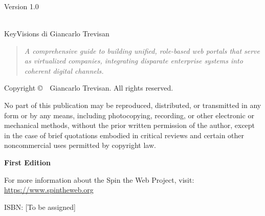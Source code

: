 \begin{titlepage}
\centering


\vspace*{1cm}

\makeatletter
{\Huge\bfseries \@title\\[0.5cm]}

\ifx\@subtitle\@empty\else
{\Large \@subtitle\\[1.5cm]}
\fi

{\large\textsc{\@author}\\[2cm]}

{\large Version 1.0\\[0.5cm]}
{\large \@date\\[2cm]}
\makeatother

\vfill

{\large KeyVisions di Giancarlo Trevisan\\[0.5cm]}

\begin{quote}
\centering
\textit{A comprehensive guide to building unified, role-based web portals that serve as virtualized companies, integrating disparate enterprise systems into coherent digital channels.}
\end{quote}

\end{titlepage}

\thispagestyle{empty}
\null\vfill
\noindent
\thispagestyle{empty}
\vspace*{\fill}
\begin{center}
\small
Copyright \copyright\ \the\year\ Giancarlo Trevisan. All rights reserved.

\medskip

\noindent
No part of this publication may be reproduced, distributed, or transmitted in any form or by any means, including photocopying, recording, or other electronic or mechanical methods, without the prior written permission of the author, except in the case of brief quotations embodied in critical reviews and certain other noncommercial uses permitted by copyright law.

\medskip

\noindent
\textbf{First Edition}

\medskip

\noindent
For more information about the Spin the Web Project, visit: \\
\url{https://www.spintheweb.org}

\medskip

\noindent
ISBN: [To be assigned]
\end{center}

\clearpage
